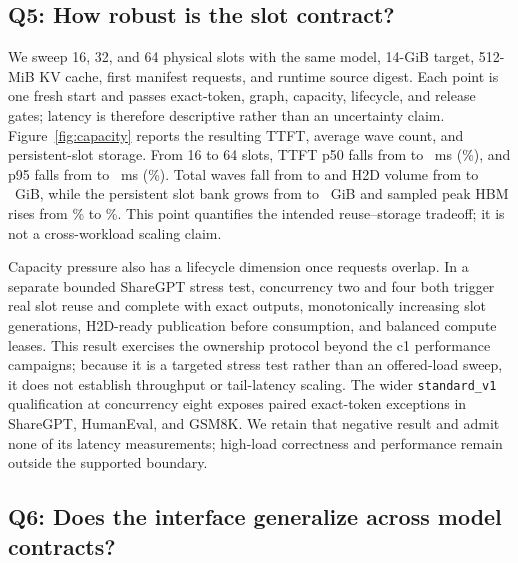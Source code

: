 \subsection{Q5: How robust is the slot contract?}

We sweep 16, 32, and 64 physical slots with the same model, 14-GiB target,
512-MiB KV cache, first \CapacityRequests{} manifest requests, and runtime
source digest. Each
point is one fresh start and passes exact-token, graph, capacity, lifecycle,
and release gates; latency is therefore descriptive rather than an uncertainty
claim. Figure~\ref{fig:capacity} reports the resulting TTFT, average wave count,
and persistent-slot storage. From 16 to 64 slots, TTFT p50 falls from
\SlotsSixteenTTFTMedian{} to \SlotsSixtyFourTTFTMedian{}~ms
(\CapacityTTFTMedianReduction\%), and p95 falls from
\SlotsSixteenTTFTTail{} to \SlotsSixtyFourTTFTTail{}~ms
(\CapacityTTFTTailReduction\%). Total waves fall from \SlotsSixteenWaves{} to
\SlotsSixtyFourWaves{} and H2D volume from \SlotsSixteenHtwoDGiB{} to
\SlotsSixtyFourHtwoDGiB{}~GiB, while the persistent slot bank grows from
\SlotsSixteenSlotGiB{} to \SlotsSixtyFourSlotGiB{}~GiB and sampled peak HBM
rises from \SlotsSixteenHBMPeak\% to \SlotsSixtyFourHBMPeak\%. This point
quantifies the intended
reuse--storage tradeoff; it is not a cross-workload scaling claim.

Capacity pressure also has a lifecycle dimension once requests overlap. In a
separate bounded ShareGPT stress test, concurrency two and four both trigger
real slot reuse and complete with exact outputs, monotonically increasing slot
generations, H2D-ready publication before consumption, and balanced compute
leases. This result exercises the ownership protocol beyond the c1 performance
campaigns; because it is a targeted stress test rather than an offered-load
sweep, it does not establish throughput or tail-latency scaling.
The wider \texttt{standard\_v1} qualification at concurrency eight exposes
paired exact-token exceptions in ShareGPT, HumanEval, and GSM8K. We retain that
negative result and admit none of its latency measurements; high-load
correctness and performance remain outside the supported boundary.

\subsection{Q6: Does the interface generalize across model contracts?}



